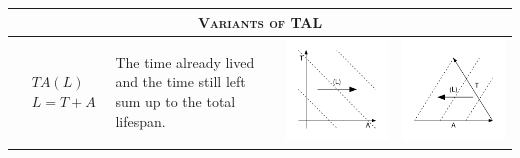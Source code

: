 \documentclass[12pt,oneside,letter]{article} %
\begin{document}
\begin{center}
\begin{longtable}{m{}m{}m{}m{}}
  \midrule
  \multicolumn{4}{c}{\textsc{Variants of TAL}}
  \\
  \midrule
  $$\begin{aligned}
    &TA(L) \\
    &L = T + A
  \end{aligned}$$ &
  The time already lived and the time still left sum up to the total lifespan. &
  \includegraphics[width = \linewidth]{Figures/JonasTable/TAl.pdf} &
  \includegraphics[width = \linewidth]{Figures/JonasTable/TAl_iso.pdf}  \\

\end{longtable}
\end{center}
\end{document}
